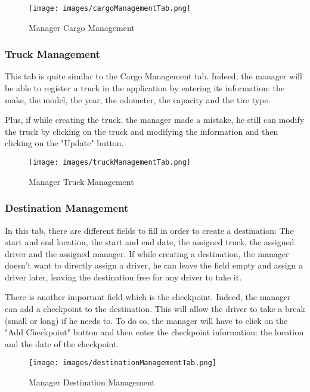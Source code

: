 \documentclass{article}
\begin{document}
\begin{figure}[h]
    \centering
    \texttt{[image: images/cargoManagementTab.png]}
    \caption{Manager Cargo Management}
\end{figure}



\subsubsection{Truck Management}
This tab is quite similar to the Cargo Management tab. Indeed, the manager will be able to
register a truck in the application by entering its information: the make, the model, the year,
the odometer, the capacity and the tire type. 

Plus, if while creating the truck, the manager made a mistake, he still can modify the truck
by clicking on the truck and modifying the information and then clicking on the "Update" button.

\begin{figure}[h]
    \centering
    \texttt{[image: images/truckManagementTab.png]}
    \caption{Manager Truck Management}
\end{figure}


\subsubsection{Destination Management}
In this tab, there are different fields to fill in order to create a destination: The 
start and end location, the start and end date, the assigned truck, the assigned driver and
the assigned manager. If while creating a destination, the manager doesn't want to directly assign
a driver, he can leave the field empty and assign a driver later, leaving the destination free 
for any driver to take it.

There is another important field which is the checkpoint. Indeed, the manager can add a checkpoint
to the destination. This will allow the driver to take a break (small or long) if he needs to.
To do so, the manager will have to click on the "Add Checkpoint" button and then enter the
checkpoint information: the location and the date of the checkpoint.


\begin{figure}[h]
    \centering
    \texttt{[image: images/destinationManagementTab.png]}
    \caption{Manager Destination Management}
\end{figure}
\end{document}
